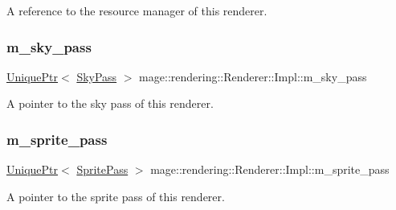 A reference to the resource manager of this renderer. \hypertarget{classmage_1_1rendering_1_1_renderer_1_1_impl_afc248fa0b293e9cbd2d0045c4caa7d26}{}\label{classmage_1_1rendering_1_1_renderer_1_1_impl_afc248fa0b293e9cbd2d0045c4caa7d26} 
\subsubsection{\texorpdfstring{m\+\_\+sky\+\_\+pass}{m\_sky\_pass}}
{\footnotesize\ttfamily \hyperlink{namespacemage_a3316d7143a973e37adf1110f2e80ca31}{Unique\+Ptr}$<$ \hyperlink{classmage_1_1rendering_1_1_sky_pass}{Sky\+Pass} $>$ mage\+::rendering\+::\+Renderer\+::\+Impl\+::m\+\_\+sky\+\_\+pass\hspace{0.3cm}{\ttfamily [private]}}

A pointer to the sky pass of this renderer. \hypertarget{classmage_1_1rendering_1_1_renderer_1_1_impl_a38a33ead382177e950db18795601723a}{}\label{classmage_1_1rendering_1_1_renderer_1_1_impl_a38a33ead382177e950db18795601723a} 
\subsubsection{\texorpdfstring{m\+\_\+sprite\+\_\+pass}{m\_sprite\_pass}}
{\footnotesize\ttfamily \hyperlink{namespacemage_a3316d7143a973e37adf1110f2e80ca31}{Unique\+Ptr}$<$ \hyperlink{classmage_1_1rendering_1_1_sprite_pass}{Sprite\+Pass} $>$ mage\+::rendering\+::\+Renderer\+::\+Impl\+::m\+\_\+sprite\+\_\+pass\hspace{0.3cm}{\ttfamily [private]}}

A pointer to the sprite pass of this renderer. \hypertarget{classmage_1_1rendering_1_1_renderer_1_1_impl_a403fbd5958b798e426683c6d671b056c}{}\label{classmage_1_1rendering_1_1_renderer_1_1_impl_a403fbd5958b798e426683c6d671b056c} 
